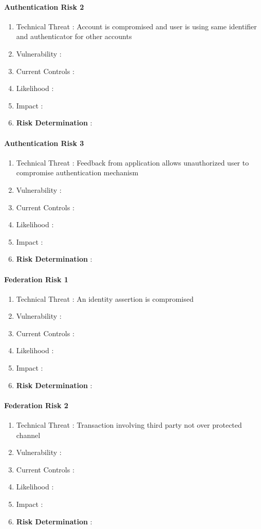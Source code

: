 \paragraph{Authentication Risk 2}
\begin{enumerate}
	\item Technical Threat : Account is compromised and user is using same identifier and authenticator for other accounts
	\item Vulnerability :
	\item Current Controls : 
	\item Likelihood :
	\item Impact :
	\item \textbf{Risk Determination} : 
\end{enumerate}

\paragraph{Authentication Risk 3}
\begin{enumerate}
	\item Technical Threat : Feedback from application allows unauthorized user to compromise authentication mechanism
	\item Vulnerability :
	\item Current Controls : 
	\item Likelihood :
	\item Impact :
	\item \textbf{Risk Determination} : 
\end{enumerate}

\paragraph{Federation Risk 1 }
\begin{enumerate}
	\item Technical Threat : An identity assertion is compromised
	\item Vulnerability :
	\item Current Controls : 
	\item Likelihood :
	\item Impact :
	\item \textbf{Risk Determination} : 
\end{enumerate}

\paragraph{Federation Risk 2}
\begin{enumerate}
	\item Technical Threat : Transaction involving third party not over protected channel
	\item Vulnerability :
	\item Current Controls : 
	\item Likelihood :
	\item Impact :
	\item \textbf{Risk Determination} : 
\end{enumerate}




